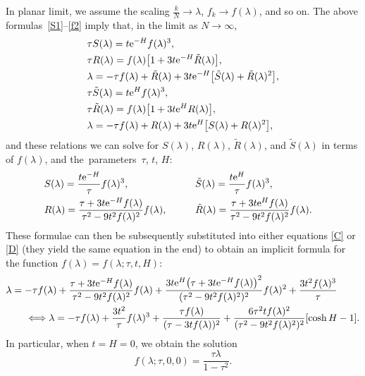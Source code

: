 \documentclass[10pt,a4paper]{amsart}
\numberwithin{equation}{section}
\begin{document}
In planar limit, we assume the scaling $\frac{k}{N} \to \lambda$, $f_k \to f(\lambda)$, and so on. The above formulas~\eqref{S1}--\eqref{f2} imply that, in the limit
as $N\to \infty$,
 \begin{align}
 &\tau S(\lambda)= t {\rm e}^{-H} f(\lambda)^3,\nonumber\\
 &\tau R(\lambda)= f(\lambda)\bigl[1 + 3t{\rm e}^{-H}\tilde{R}(\lambda)\bigr],\nonumber\\
 &\lambda= -\tau f(\lambda) + \tilde{R}(\lambda) + 3t{\rm e}^{-H}\bigl[\tilde{S}(\lambda) + \tilde{R}(\lambda)^2\bigr], \label{C}\\
 &\tau \tilde{S}(\lambda)= t {\rm e}^{H} f(\lambda)^3,\nonumber\\
 &\tau \tilde{R}(\lambda)= f(\lambda)\bigl[1 + 3t{\rm e}^{H}{R}(\lambda)\bigr],\nonumber\\
 &\lambda= -\tau f(\lambda) + {R}(\lambda) + 3t{\rm e}^{H}\bigl[S(\lambda) + R(\lambda)^2\bigr],\label{D}
 \end{align}
and these relations we can solve for $S(\lambda)$, $R(\lambda)$, $\tilde{R}(\lambda)$, and $\tilde{S}(\lambda)$ in terms of $f(\lambda)$,
and the~param\-e\-ters~$\tau$, $t$, $H$:
 \begin{alignat*}{3}
 &S(\lambda)= \frac{t{\rm e}^{-H}}{\tau} f(\lambda)^3,\qquad&& \tilde{S}(\lambda) = \frac{t{\rm e}^{H}}{\tau} f(\lambda)^3,&\\
 &R(\lambda)= \frac{\tau + 3t{\rm e}^{-H} f(\lambda)}{\tau^2 - 9t^2f(\lambda)^2}f(\lambda),\qquad&&
 \tilde{R}(\lambda) = \frac{\tau + 3t{\rm e}^{H} f(\lambda)}{\tau^2 - 9t^2f(\lambda)^2}f(\lambda).&
 \end{alignat*}
These formulae can then be subsequently substituted into either equations \eqref{C} or \eqref{D} (they yield the same equation in the end) to obtain an
implicit formula for the function $f(\lambda) = f(\lambda;\tau,t,H)$:
 \begin{align}
 &\lambda= -\tau f(\lambda) + \frac{\tau + 3t{\rm e}^{-H} f(\lambda)}{\tau^2 - 9t^2f(\lambda)^2}f(\lambda) + \frac{3t{\rm e}^{H}\bigl(\tau + 3t{\rm e}^{-H} f(\lambda)\bigr)^2}{(\tau^2 - 9t^2f(\lambda)^2)^2}f(\lambda)^2 + \frac{3t^2f(\lambda)^3}{\tau}\label{f-formula}\\
 &\qquad{}\Longleftrightarrow \lambda = -\tau f(\lambda) + \frac{3t^2}{\tau}f(\lambda)^3 + \frac{\tau f(\lambda)}{(\tau - 3tf(\lambda))^2}+\frac{6\tau^2tf(\lambda)^2}{(\tau^2-9t^2f(\lambda)^2)^2}[\cosh H -1].\nonumber
 \end{align}
In particular, when $t=H=0$, we obtain the solution
 \begin{equation*}
 f(\lambda;\tau,0,0) = \frac{\tau \lambda}{1-\tau^2}.
 \end{equation*}
\end{document}
